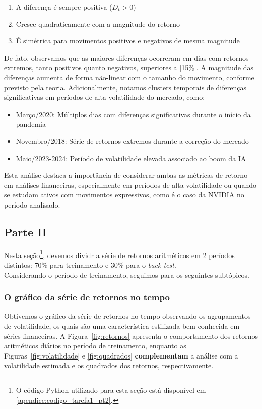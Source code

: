 \documentclass[a4paper, 12pt]{article}
\begin{document}
\begin{enumerate}
\item A diferença é sempre positiva ($D_t > 0$)
\item Cresce quadraticamente com a magnitude do retorno
\item É simétrica para movimentos positivos e negativos de mesma magnitude
\end{enumerate}
De fato, observamos que as maiores diferenças ocorreram em dias com retornos extremos, tanto positivos quanto negativos, superiores a |15\%|. A magnitude das diferenças aumenta de forma não-linear com o tamanho do movimento, conforme previsto pela teoria.
Adicionalmente, notamos clusters temporais de diferenças significativas em períodos de alta volatilidade do mercado, como:
\begin{itemize}
\item Março/2020: Múltiplos dias com diferenças significativas durante o início da pandemia
\item Novembro/2018: Série de retornos extremos durante a correção do mercado
\item Maio/2023-2024: Período de volatilidade elevada associado ao boom da IA
\end{itemize}
Esta análise destaca a importância de considerar ambas as métricas de retorno em análises financeiras, especialmente em períodos de alta volatilidade ou quando se estudam ativos com movimentos expressivos, como é o caso da NVIDIA no período analisado.




\subsection{Parte II}\label{subsec:tarefa1_pt2}
Nesta seção\footnote{O código Python utilizado para esta seção está disponível em \ref{apendice:codigo_tarefa1_pt2}.}, devemos dividr a série de retornos aritméticos em 2 períodos distintos: 70\% para treinamento e 30\% para o \textit{back-test}.\\

Considerando o período de treinamento, seguimos para os seguintes subtópicos.

\subsubsection{O gráfico da série de retornos no tempo}

Obtivemos o gráfico da série de retornos no tempo observando os agrupamentos de volatilidade, os quais são uma característica estilizada bem conhecida em séries financeiras. A Figura~\ref{fig:retornos} apresenta o comportamento dos retornos aritméticos diários no período de treinamento, enquanto as Figuras~\ref{fig:volatilidade} e \ref{fig:quadrados} \textbf{complementam} a análise com a volatilidade estimada e os quadrados dos retornos, respectivamente.
\end{document}
